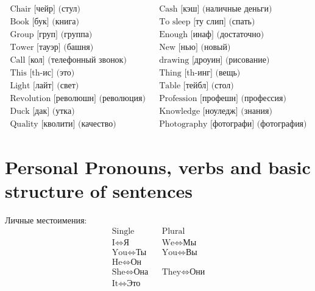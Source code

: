 \documentclass{tstextbook}
\begin{document}
	\begin{example}
		\begin{align*}
			\text{Chair [чейр] (стул)} && \text{Cash [кэш] (наличные деньги)} \\
			\text{Book [бук] (книга)} && \text{To sleep [ту слип] (спать)} \\
			\text{Group [груп] (группа)}  && \text{Enough [инаф] (достаточно)} \\
			\text{Tower [тауэр] (башня)} && \text{New [нью] (новый)} \\
			\text{Call [кол] (телефонный звонок)} && \text{drawing [дроуин] (рисование)} \\
			\text{This [th-ис] (это)} && \text{Thing [th-инг] (вещь)} \\
			\text{Light [лайт] (свет)} && \text{Table [тейбл] (стол)} \\
			\text{Revolution [революшн] (революция)} && \text{Profession [профешн] (профессия)} \\
			\text{Duck [дак] (утка)} && \text{Knowledge [ноуледж] (знания)} \\
			\text{Quality [кволити] (качество)} && \text{Photography [фотографи] (фотография)}
		\end{align*}
	\end{example}
	
	\section{Personal Pronouns, verbs and basic structure of sentences}
	
	\begin{theorem}
		\label{th: personal_pronouns}
		Личные местоимения:
		\begin{align*}
			\text{Single} && \text{Plural}  \\
			\hline
			\text{I} \Leftrightarrow \text{Я} && \text{We} \Leftrightarrow \text{Мы} \\
			\text{You} \Leftrightarrow \text{Ты} && \text{You} \Leftrightarrow \text{Вы} \\
			\text{He} \Leftrightarrow \text{Он} \\
			\text{She} \Leftrightarrow \text{Она} && \text{They} \Leftrightarrow \text{Они} \\
			\text{It} \Leftrightarrow \text{Это} \\
		\end{align*}
	\end{theorem}
\end{document}

